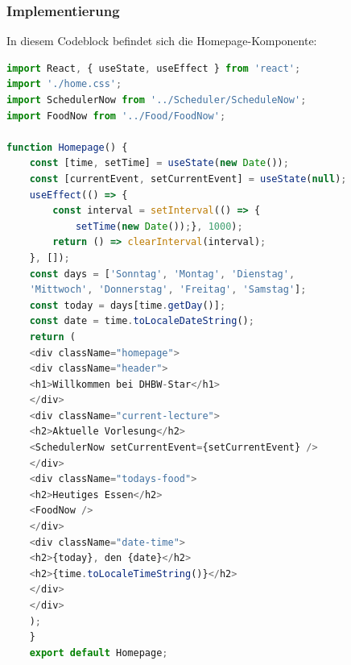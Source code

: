 \subsubsection{Implementierung}
In diesem Codeblock befindet sich die Homepage-Komponente:\\
\begin{lstlisting}[language=JavaScript,
	frame=single,           % Ein Rahmen um den Code
	framexleftmargin=15pt,  % Rahmen link von den Zahlen
	style=algoBericht,
	label={Homepage-Komponente},
	captionpos=b ,          % Caption unter den Code setzen
	caption={Homepage-Komponente}]
import React, { useState, useEffect } from 'react';
import './home.css';
import SchedulerNow from '../Scheduler/ScheduleNow';
import FoodNow from '../Food/FoodNow';

function Homepage() {
	const [time, setTime] = useState(new Date());
	const [currentEvent, setCurrentEvent] = useState(null);
	useEffect(() => {
		const interval = setInterval(() => {
			setTime(new Date());}, 1000);
		return () => clearInterval(interval);
	}, []);
	const days = ['Sonntag', 'Montag', 'Dienstag', 
	'Mittwoch', 'Donnerstag', 'Freitag', 'Samstag'];
	const today = days[time.getDay()];
	const date = time.toLocaleDateString();
	return (
	<div className="homepage">
	<div className="header">
	<h1>Willkommen bei DHBW-Star</h1>
	</div>
	<div className="current-lecture">
	<h2>Aktuelle Vorlesung</h2>
	<SchedulerNow setCurrentEvent={setCurrentEvent} />
	</div>
	<div className="todays-food">
	<h2>Heutiges Essen</h2>
	<FoodNow />
	</div>
	<div className="date-time">
	<h2>{today}, den {date}</h2>
	<h2>{time.toLocaleTimeString()}</h2>
	</div>
	</div>
	);
	}
	export default Homepage;
	
\end{lstlisting}

